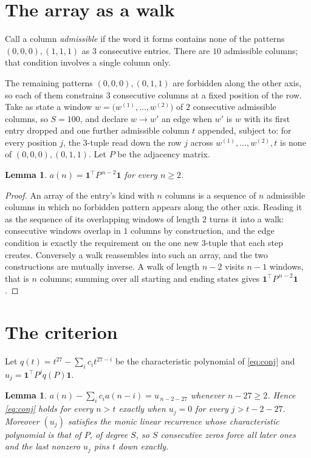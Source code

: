 \documentclass[11pt,a4paper]{article}
\theoremstyle{plain}
\newtheorem{lemma}[theorem]{Lemma}
\theoremstyle{definition}
\begin{document}
\section{The array as a walk}

Call a column \emph{admissible} if the word it forms contains none of the patterns
$(0,0,0), (1,1,1)$ as $3$ consecutive entries. There are $10$ admissible columns; that condition
involves a single column only.

The remaining patterns $(0,0,0), (0,1,1)$ are forbidden along the other axis, so each of them
constrains $3$ consecutive columns at a fixed position of the row. Take as state a
window $w=\bigl(w^{(1)},\dots,w^{(2)}\bigr)$ of $2$ consecutive admissible
columns, so $S=100$, and declare $w\to w'$ an edge when $w'$ is $w$ with its first entry
dropped and one further admissible column $t$ appended, subject to: for every position
$j$, the $3$-tuple read down the row $j$ across $w^{(1)},\dots,w^{(2)},t$
is none of $(0,0,0), (0,1,1)$. Let $P$ be the adjacency matrix.

\begin{lemma}\label{lem:walk}
$a(n)=\mathbf{1}^{\!\top}P^{\,n-2}\mathbf{1}$ for every $n\ge2$.
\end{lemma}

\begin{proof}
An array of the entry's kind with $n$ columns is a sequence of $n$ admissible columns in
which no forbidden pattern appears along the other axis. Reading it as the sequence of its
overlapping windows of length $2$ turns it into a walk: consecutive windows overlap in
$1$ columns by construction, and the edge condition is exactly the requirement on the one
new $3$-tuple that each step creates. Conversely a walk reassembles into such an array,
and the two constructions are mutually inverse. A walk of length $n-2$ visits $n-1$
windows, that is $n$ columns; summing over all starting and ending states gives
$\mathbf{1}^{\!\top}P^{\,n-2}\mathbf{1}$.
\end{proof}

\section{The criterion}

Let $q(t)=t^{27}-\sum_i c_i t^{27-i}$ be the characteristic polynomial of
\eqref{eq:conj} and $u_j=\mathbf{1}^{\!\top}P^{j}q(P)\mathbf{1}$.

\begin{lemma}\label{lem:crit}
$a(n)-\sum_i c_i a(n-i)=u_{\,n-2-27}$ whenever $n-27\ge2$. Hence
\eqref{eq:conj} holds for every $n>t$ exactly when $u_j=0$ for every
$j>t-2-27$. Moreover $(u_j)$ satisfies the monic linear recurrence whose
characteristic polynomial is that of $P$, of degree $S$, so $S$ consecutive zeros force all
later ones and the last nonzero $u_j$ pins $t$ down exactly.
\end{lemma}
\end{document}
